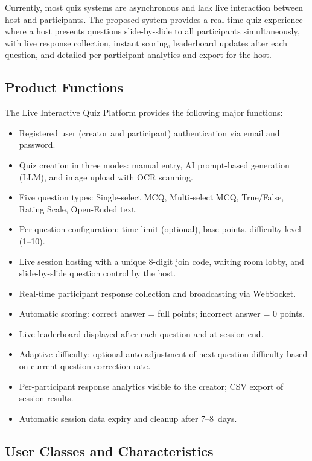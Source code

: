 \documentclass[12pt,a4paper]{article}
\begin{document}
Currently, most quiz systems are asynchronous and lack live interaction between host
and participants. The proposed system provides a real-time quiz experience where a
host presents questions slide-by-slide to all participants simultaneously, with live
response collection, instant scoring, leaderboard updates after each question, and
detailed per-participant analytics and export for the host.

\subsection{Product Functions}
The Live Interactive Quiz Platform provides the following major functions:

\begin{itemize}
  \item Registered user (creator and participant) authentication via email and password.
  \item Quiz creation in three modes: manual entry, AI prompt-based generation (LLM),
        and image upload with OCR scanning.
  \item Five question types: Single-select MCQ, Multi-select MCQ, True/False, Rating
        Scale, Open-Ended text.
  \item Per-question configuration: time limit (optional), base points, difficulty
        level (1--10).
  \item Live session hosting with a unique 8-digit join code, waiting room lobby,
        and slide-by-slide question control by the host.
  \item Real-time participant response collection and broadcasting via WebSocket.
  \item Automatic scoring: correct answer = full points; incorrect answer = 0 points.
  \item Live leaderboard displayed after each question and at session end.
  \item Adaptive difficulty: optional auto-adjustment of next question difficulty
        based on current question correction rate.
  \item Per-participant response analytics visible to the creator; CSV export of
        session results.
  \item Automatic session data expiry and cleanup after 7--8~days.
\end{itemize}

\subsection{User Classes and Characteristics}
\end{document}
